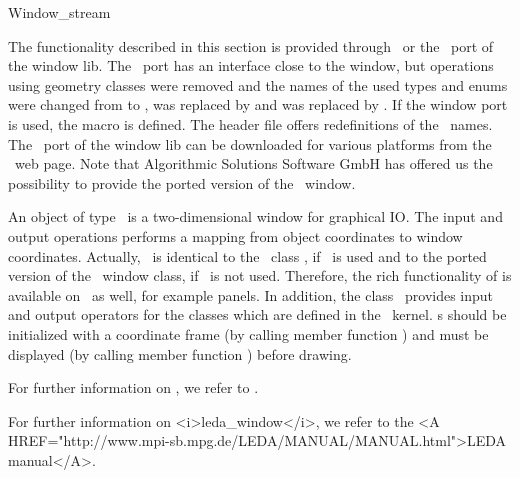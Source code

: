 \ccSetTwoColumns{}{\hspace*{8.5cm}}


\medskip
\begin{ccClass} {Window_stream}

The functionality described in this section is provided through \leda\ or
the \cgal\ port of the \leda window lib. The \cgal\ port has an interface
close to the \leda window, but operations using \leda geometry classes
were removed and the names of the used types and enums were changed from
 to , 
was replaced by  and  was replaced
by .
If the window port is used, the macro  is 
defined. The header file  offers
redefinitions of the \leda\ names.
The \cgal\ port of the \leda window lib can be downloaded for various platforms
from the \cgal\ web page. Note that Algorithmic Solutions Software GmbH 
has offered us the possibility to provide the ported version of the \leda\ 
window.

\ccDefinition 

An object of type \ccClassName\ is a two-dimensional window for
graphical IO. The input and output operations performs a mapping from
object coordinates to window coordinates.
Actually, \ccClassName\ is identical to the \leda\ class ,
if \leda\ is used and to the ported version of the \leda\ window class, if
\leda\ is not used.
Therefore, the rich functionality of  is available on
\ccClassName\ as well, for example panels.
In addition, the class \ccClassName\ provides input and output 
operators for the classes which are defined in the \cgal\ kernel.
\ccClassName s should be initialized with a coordinate frame (by calling member function
\ccc{init}) and must be displayed (by calling member function \ccc{display}) before
drawing.
 
\begin{ccTexOnly}
For further information on , we refer to \cite{mnsu-lum}.
\end{ccTexOnly}
\begin{ccHtmlOnly}
For further information on <i>leda_window</i>, we refer to the 
<A HREF="http://www.mpi-sb.mpg.de/LEDA/MANUAL/MANUAL.html">LEDA manual</A>.
\end{ccHtmlOnly}


\end{ccClass}
